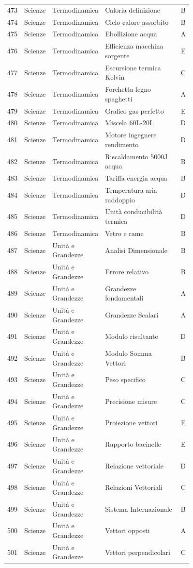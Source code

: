\documentclass[20pt, a4paper]{article}
\begin{document}
\begin{longtable}{@{}r>{\raggedright\arraybackslash}p{0.14\linewidth}>{\raggedright\arraybackslash}p{0.20\linewidth}>{\raggedright\arraybackslash}p{0.42\linewidth}c@{}}
473 & Scienze & Termodinamica & Caloria definizione & B \\
474 & Scienze & Termodinamica & Ciclo calore assorbito & B \\
475 & Scienze & Termodinamica & Ebollizione acqua & A \\
476 & Scienze & Termodinamica & Efficienza macchina sorgente & E \\
477 & Scienze & Termodinamica & Escursione termica Kelvin & C \\
478 & Scienze & Termodinamica & Forchetta legno spaghetti & A \\
479 & Scienze & Termodinamica & Grafico gas perfetto & E \\
480 & Scienze & Termodinamica & Miscela 60L-20L & D \\
481 & Scienze & Termodinamica & Motore ingegnere rendimento & D \\
482 & Scienze & Termodinamica & Riscaldamento 5000J acqua & B \\
483 & Scienze & Termodinamica & Tariffa energia acqua & B \\
484 & Scienze & Termodinamica & Temperatura aria raddoppio & D \\
485 & Scienze & Termodinamica & Unità conducibilità termica & D \\
486 & Scienze & Termodinamica & Vetro e rame & B \\
487 & Scienze & Unità e Grandezze & Analisi Dimensionale & B \\
488 & Scienze & Unità e Grandezze & Errore relativo & B \\
489 & Scienze & Unità e Grandezze & Grandezze fondamentali & A \\
490 & Scienze & Unità e Grandezze & Grandezze Scalari & A \\
491 & Scienze & Unità e Grandezze & Modulo risultante & D \\
492 & Scienze & Unità e Grandezze & Modulo Somma Vettori & B \\
493 & Scienze & Unità e Grandezze & Peso specifico & C \\
494 & Scienze & Unità e Grandezze & Precisione misure & C \\
495 & Scienze & Unità e Grandezze & Proiezione vettori & E \\
496 & Scienze & Unità e Grandezze & Rapporto bacinelle & E \\
497 & Scienze & Unità e Grandezze & Relazione vettoriale & D \\
498 & Scienze & Unità e Grandezze & Relazioni Vettoriali & C \\
499 & Scienze & Unità e Grandezze & Sistema Internazionale & B \\
500 & Scienze & Unità e Grandezze & Vettori opposti & A \\
501 & Scienze & Unità e Grandezze & Vettori perpendicolari & C
\end{longtable}
\end{document}
